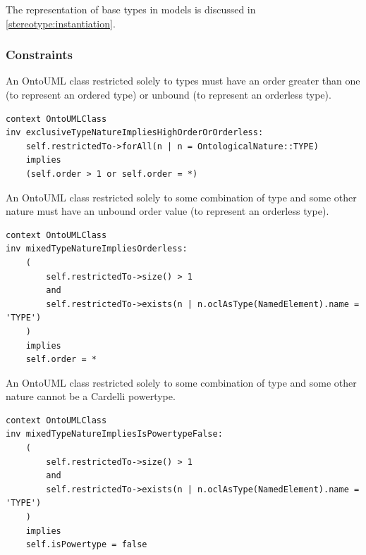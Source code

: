 The representation of base types in models is discussed in \autoref{stereotype:instantiation}.


\subsubsection{Constraints}

\begin{constraint}
\label{constraint:exclusiveTypeNatureImpliesHighOrderOrOrderless}
An OntoUML class restricted solely to types must have an order greater than one (to represent an ordered type) or unbound (to represent an orderless type).

\begin{lstlisting}[language=OCL]
context OntoUMLClass
inv exclusiveTypeNatureImpliesHighOrderOrOrderless:
    self.restrictedTo->forAll(n | n = OntologicalNature::TYPE)
    implies
    (self.order > 1 or self.order = *)
\end{lstlisting}
\end{constraint}

\begin{constraint}
\label{constraint:mixedTypeNatureOrderConstraint}
An OntoUML class restricted solely to some combination of type and some other nature must have an unbound order value (to represent an orderless type).

\begin{lstlisting}[language=OCL]
context OntoUMLClass
inv mixedTypeNatureImpliesOrderless:
    (
        self.restrictedTo->size() > 1
        and
        self.restrictedTo->exists(n | n.oclAsType(NamedElement).name = 'TYPE')
    )
    implies
    self.order = *
\end{lstlisting}
\end{constraint}

\begin{constraint}
\label{constraint:mixedTypeNatureImpliesIsPowertypeFalse}
An OntoUML class restricted solely to some combination of type and some other nature cannot be a Cardelli powertype.

\begin{lstlisting}[language=OCL]
context OntoUMLClass
inv mixedTypeNatureImpliesIsPowertypeFalse:
    (
        self.restrictedTo->size() > 1
        and
        self.restrictedTo->exists(n | n.oclAsType(NamedElement).name = 'TYPE')
    )
    implies
    self.isPowertype = false
\end{lstlisting}
\end{constraint}

